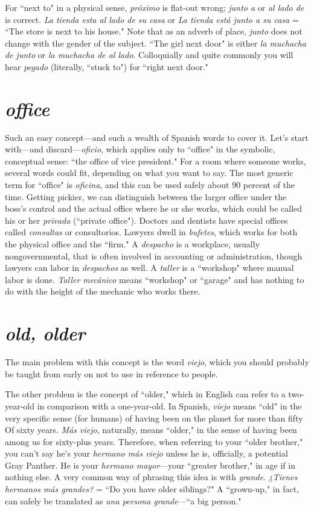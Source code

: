 For ``next to" in a physical sense, \emph{próximo} is flat-out wrong;
\emph{junto a} or \emph{al lado de} is correct. \emph{La tienda esta al lado de su casa} or \emph{La
tienda está junto a su casa} = ``The store is next to his house." Note
that as an adverb of place, \emph{junto} does not change with the gender of
the subject. ``The girl next door" is either \emph{la muchacha de junto} or \emph{la
muchacha de al lado}. Colloquially and quite commonly you will hear
\emph{pegado} (literally, ``stuck to") for ``right next door."

\section{\emph{office}}

Such an easy concept---and such a wealth of Spanish words to
cover it. Let's start with---and discard---\emph{oficio}, which applies only to
``office" in the symbolic, conceptual sense: ``the office of vice president." For a room where someone works, several words could fit, depending on what you want to say. The most generic term for ``office" is
\emph{oficina}, and this can be used safely about 90 percent of the time. Getting pickier, we can distinguish between the larger office under the
boss's control and the actual office where he or she works, which could
be called his or her \emph{privada} (``private office"). Doctors and dentists
have special offices called \emph{consultas} or consultorios. Lawyers dwell in
\emph{bufetes}, which works for both the physical office and the ``firm." A
\emph{despacho} is a workplace, usually nongovernmental, that is often involved in accounting or administration, though lawyers can labor in
\emph{despachos} as well. A \emph{taller} is a ``workshop" where manual labor is
done. \emph{Taller mecánico} means ``workshop" or ``garage" and has nothing
to do with the height of the mechanic who works there.

\section{\emph{old, older}}

The main problem with this concept is the word \emph{viejo}, which
you should probably be taught from early on not to use in reference
to people.

The other problem is the concept of ``older," which in English
can refer to a two-year-old in comparison with a one-year-old. In Spanish, \emph{viejo} means ``old" in the very specific sense (for humans) of having
been on the planet for more than fifty Of sixty years. \emph{Más viejo}, naturally, means ``older," in the sense of having been among us for sixty-plus years. Therefore, when referring to your ``older brother," you can't
say he's your \emph{hermano más viejo} unless he is, officially, a potential
Gray Panther. He is your \emph{hermano mayor}---your ``greater brother," in
age if in nothing else. A very common way of phrasing this idea is with
\emph{grande}. \emph{¿Tienes hermanos más grandes?} = ``Do you have older siblings?" A ``grown-up," in fact, can safely be translated as \emph{una persona
grande}---``a big person."

